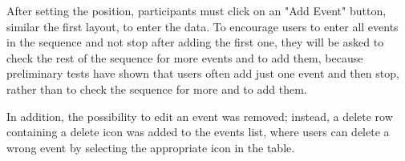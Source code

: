 After setting the position, participants must click on an "Add Event" button, similar the first layout, to enter the data. To encourage users to enter all events in the sequence and not stop after adding the first one, they will be asked to check the rest of the sequence for more events and to add them, because preliminary tests have shown that users often add just one event and then stop, rather than to check the sequence for more and to add them.

In addition, the possibility to edit an event was removed; instead, a delete row containing a delete icon was added to the events list, where users can delete a wrong event by selecting the appropriate icon in the table.

